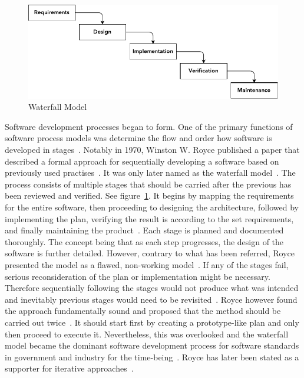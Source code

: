 \documentclass[english]{tktltiki2}
\begin{document}
\begin{figure}[h!]

    \vspace{1cm}
    \centering

    \includegraphics{figures/waterfall-model}

    \caption{Waterfall Model}
    \label{figure:waterfall-model}

    \vspace{1cm}

\end{figure}

Software development processes began to form. One of the primary functions of software process models was determine the flow and order how software is developed in stages~\cite{Boe88}. Notably in 1970, Winston W. Royce published a paper that described a formal approach for sequentially developing a software based on previously used practises~\cite{Roy70}. It was only later named as the waterfall model~\cite{Boe88, LB03}. The process consists of multiple stages that should be carried after the previous has been reviewed and verified. See figure~\ref{figure:waterfall-model}. It begins by mapping the requirements for the entire software, then proceeding to designing the architecture, followed by implementing the plan, verifying the result is according to the set requirements, and finally maintaining the product~\cite{Roy70}. Each stage is planned and documented thoroughly. The concept being that as each step progresses, the design of the software is further detailed. However, contrary to what has been referred, Royce presented the model as a flawed, non-working model~\cite{Roy70}. If any of the stages fail, serious reconsideration of the plan or implementation might be necessary. Therefore sequentially following the stages would not produce what was intended and inevitably previous stages would need to be revisited~\cite{Roy70}. Royce however found the approach fundamentally sound and proposed that the method should be carried out twice~\cite{Roy70, Boe88}. It should start first by creating a prototype-like plan and only then proceed to execute it. Nevertheless, this was overlooked and the waterfall model became the dominant software development process for software standards in government and industry for the time-being~\cite{Boe88, LB03}. Royce has later been stated as a supporter for iterative approaches~\cite{LB03}.
\end{document}
